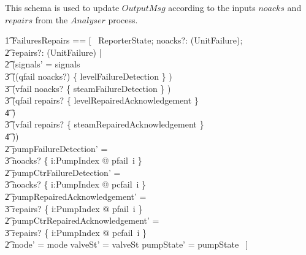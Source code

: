 \documentclass{report} %
\begin{document}
This schema is used to update $OutputMsg$ according to the inputs $noacks$ and $repairs$ from the $Analyser$ process.
\begin{zed}
        \t1 FailuresRepairs == [~ \Delta ReporterState; noacks?: (\power UnitFailure); \\
            \t2 repairs?: (\power UnitFailure) | \\
             \t2   (signals' = signals \cup \\
                \t3 (\IF (qfail \in noacks?) \THEN \{ levelFailureDetection \} \ELSE \emptyset) \cup \\
                \t3 (\IF vfail \in noacks? \THEN \{ steamFailureDetection \} \ELSE \emptyset) \cup \\
                \t3 (\IF qfail \in repairs? \THEN \{ levelRepairedAcknowledgement \} \\
                    \t4 \ELSE \emptyset) \cup \\
                \t3 (\IF vfail \in repairs? \THEN \{ steamRepairedAcknowledgement \} \\
                    \t4 \ELSE \emptyset)) \land \\
             \t2   pumpFailureDetection' = \\
                \t3 noacks? \cap \{ i:PumpIndex @ pfail~i \} \land \\
             \t2   pumpCtrFailureDetection' = \\
                \t3 noacks? \cap \{ i:PumpIndex @ pcfail~i \} \land \\
             \t2   pumpRepairedAcknowledgement' = \\
                \t3 repairs? \cap \{ i:PumpIndex @ pfail~i \} \land \\
             \t2   pumpCtrRepairedAcknowledgement' = \\
                \t3 repairs? \cap \{ i:PumpIndex @ pcfail~i \} \land \\
             \t2   mode' = mode \land valveSt' = valveSt \land pumpState' = pumpState
            ~] \\
\end{zed}
\end{document}
